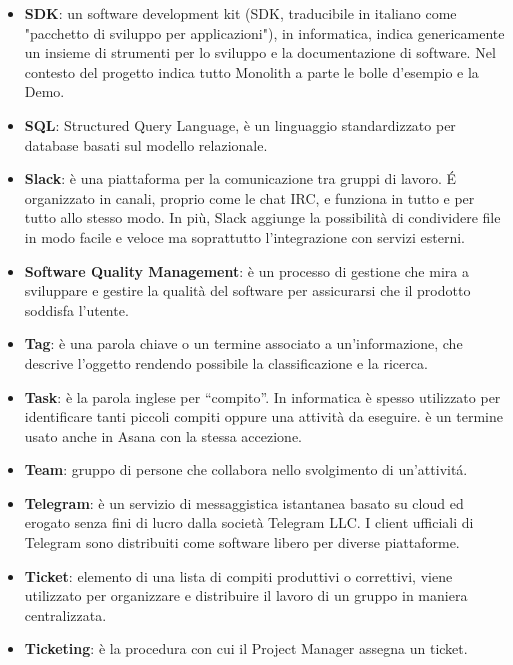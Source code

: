 \begin{itemize}
\item[] \textbf{SDK}: un software development kit (SDK, traducibile in italiano come "pacchetto di sviluppo per applicazioni"), in informatica, indica genericamente un insieme di strumenti per lo sviluppo e la documentazione di software. Nel contesto del progetto indica tutto Monolith a parte le bolle d'esempio e la Demo.
\item[] \textbf{SQL}: Structured Query Language, è un linguaggio standardizzato per database basati sul modello relazionale.
\item[] \textbf{Slack}: è una piattaforma per la comunicazione tra gruppi di lavoro. \'E organizzato in canali, proprio come le chat IRC, e funziona in tutto e per tutto allo stesso modo. In più, Slack aggiunge la possibilità di condividere file in modo facile e veloce ma soprattutto l'integrazione con servizi esterni.
\item[] \textbf{Software Quality Management}: è un processo di gestione che mira a sviluppare e gestire la qualità del software per assicurarsi che il prodotto soddisfa l'utente.
\end{itemize}
\newpage

\begin{itemize}
\item[] \textbf{Tag}: è una parola chiave o un termine associato a un'informazione, che descrive l'oggetto rendendo possibile la classificazione e la ricerca.
\item[] \textbf{Task}: è la parola inglese per “compito”. In informatica è spesso utilizzato per identificare tanti piccoli compiti oppure una attività da eseguire. è un termine usato anche in Asana con la stessa accezione.
\item[] \textbf{Team}: gruppo di persone che collabora nello svolgimento di un'attivit\'a.
\item[] \textbf{Telegram}: è un servizio di messaggistica istantanea basato su cloud ed erogato senza fini di lucro dalla società Telegram LLC. I client ufficiali di Telegram sono distribuiti come software libero per diverse piattaforme.
\item[] \textbf{Ticket}: elemento di una lista di compiti produttivi o correttivi, viene utilizzato per organizzare e distribuire il lavoro di un gruppo in maniera centralizzata.
\item[] \textbf{Ticketing}: è la procedura con cui il Project Manager assegna un ticket.
\end{itemize}
\newpage

